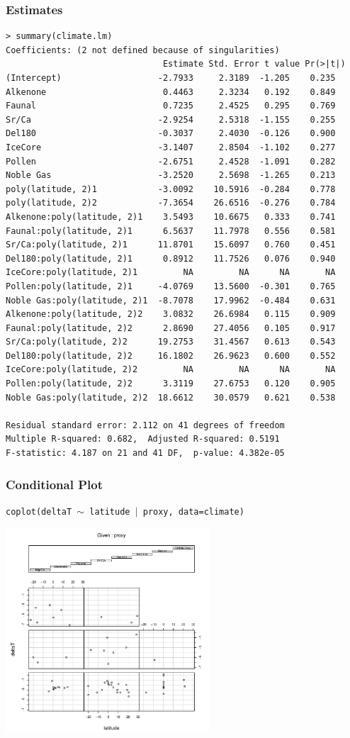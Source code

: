 \documentclass[handout]{beamer}
\begin{document}
\begin{frame}[fragile]
  \frametitle{Estimates}
  \begin{tiny}
\begin{verbatim}
> summary(climate.lm)
Coefficients: (2 not defined because of singularities)
                               Estimate Std. Error t value Pr(>|t|)
(Intercept)                   -2.7933     2.3189  -1.205    0.235
Alkenone                       0.4463     2.3234   0.192    0.849
Faunal                         0.7235     2.4525   0.295    0.769
Sr/Ca                         -2.9254     2.5318  -1.155    0.255
Del180                        -0.3037     2.4030  -0.126    0.900
IceCore                       -3.1407     2.8504  -1.102    0.277
Pollen                        -2.6751     2.4528  -1.091    0.282
Noble Gas                     -3.2520     2.5698  -1.265    0.213
poly(latitude, 2)1            -3.0092    10.5916  -0.284    0.778
poly(latitude, 2)2            -7.3654    26.6516  -0.276    0.784
Alkenone:poly(latitude, 2)1    3.5493    10.6675   0.333    0.741
Faunal:poly(latitude, 2)1      6.5637    11.7978   0.556    0.581
Sr/Ca:poly(latitude, 2)1      11.8701    15.6097   0.760    0.451
Del180:poly(latitude, 2)1      0.8912    11.7526   0.076    0.940
IceCore:poly(latitude, 2)1         NA         NA      NA       NA
Pollen:poly(latitude, 2)1     -4.0769    13.5600  -0.301    0.765
Noble Gas:poly(latitude, 2)1  -8.7078    17.9962  -0.484    0.631
Alkenone:poly(latitude, 2)2    3.0832    26.6984   0.115    0.909
Faunal:poly(latitude, 2)2      2.8690    27.4056   0.105    0.917
Sr/Ca:poly(latitude, 2)2      19.2753    31.4567   0.613    0.543
Del180:poly(latitude, 2)2     16.1802    26.9623   0.600    0.552
IceCore:poly(latitude, 2)2         NA         NA      NA       NA
Pollen:poly(latitude, 2)2      3.3119    27.6753   0.120    0.905
Noble Gas:poly(latitude, 2)2  18.6612    30.0579   0.621    0.538

Residual standard error: 2.112 on 41 degrees of freedom
Multiple R-squared: 0.682,	Adjusted R-squared: 0.5191 
F-statistic: 4.187 on 21 and 41 DF,  p-value: 4.382e-05 

\end{verbatim}
  \end{tiny}
\end{frame}
\begin{frame}
  \frametitle{Conditional Plot}
{\tt coplot(deltaT $\sim$ latitude $\mid$ proxy, data=climate)}
  \centerline{\includegraphics[height=3in]{temp-lat-proaxy}}
\end{frame}
\end{document}
